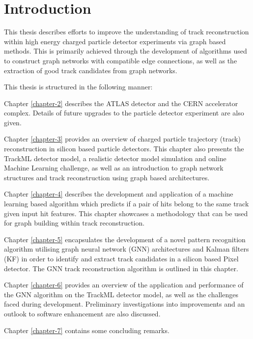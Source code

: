 
\chapter{Introduction}

\setlength\parindent{0pt}

This thesis describes efforts to improve the understanding of track reconstruction within high energy charged particle detector experiments via graph based methods. This is primarily achieved through the development of algorithms used to construct graph networks with compatible edge connections, as well as the extraction of good track candidates from graph networks. 

This thesis is structured in the following manner:

Chapter \ref{chapter-2} describes the ATLAS detector and the CERN accelerator complex. Details of future upgrades to the particle detector experiment are also given.

Chapter \ref{chapter-3} provides an overview of charged particle trajectory (track) reconstruction in silicon based particle detectors. This chapter also presents the TrackML detector model, a realistic detector model simulation and online Machine Learning challenge, as well as an introduction to graph network structures and track reconstruction using graph based architectures.

Chapter \ref{chapter-4} describes the development and application of a machine learning based algorithm which predicts if a pair of hits belong to the same track given input hit features. This chapter showcases a methodology that can be used for graph building within track reconstruction.

Chapter \ref{chapter-5} encapsulates the development of a novel pattern recognition algorithm utilising graph neural network (GNN) architectures and Kalman filters (KF) in order to identify and extract track candidates in a silicon based Pixel detector. The GNN track reconstruction algorithm is outlined in this chapter.

Chapter \ref{chapter-6} provides an overview of the application and performance of the GNN algorithm on the TrackML detector model, as well as the challenges faced during development. Preliminary investigations into improvements and an outlook to software enhancement are also discussed.

Chapter \ref{chapter-7} contains some concluding remarks.

